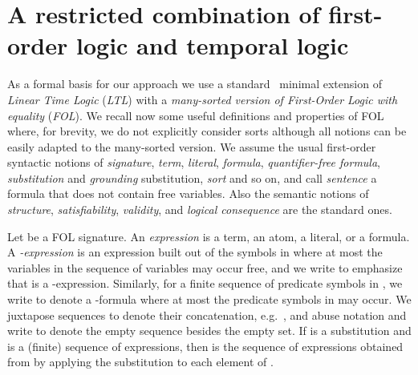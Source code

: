 \documentclass[conference]{IEEEtran}
\begin{document}
\section{A restricted combination of first-order logic and temporal logic}
\label{subsec:comb-fol-ltl}

As a formal basis for our approach we use a
standard~\cite{manna-pnueli-book} minimal extension of \emph{Linear Time Logic} (\emph{LTL})
with a \emph{many-sorted version of First-Order Logic with equality}
(\emph{FOL}). We recall now some useful definitions and properties of
FOL where, for brevity, we do not explicitly consider sorts
although all notions can be easily adapted to the many-sorted version.
We assume the usual first-order syntactic notions of \emph{signature},
\emph{term}, \emph{literal}, \emph{formula}, \emph{quantifier-free
  formula}, \emph{substitution} and \emph{grounding} substitution,
\emph{sort} and so on, and call \emph{sentence} a formula that does
not contain free variables. Also the semantic notions of
\emph{structure}, \emph{satisfiability}, \emph{validity}, and
\emph{logical consequence} are the standard ones.  

Let  be a FOL signature. 
An \emph{expression} is a term, an atom, a literal, or a formula.
A \emph{-expression} is an expression built out
of the symbols in  where at most the variables in
the sequence  of variables may occur free, and we write
 to emphasize that  is a
-expression. Similarly, for a finite sequence
 of predicate symbols in , we write
 to denote a -formula where at most the
predicate symbols in  may occur.  We juxtapose
sequences to denote their concatenation,
e.g.~, and abuse notation and write
 to denote the empty sequence besides the empty set.  If
 is a substitution and  is a (finite) sequence
of expressions, then  is the sequence of
expressions obtained from  by applying the substitution
 to each element of .  
\end{document}

